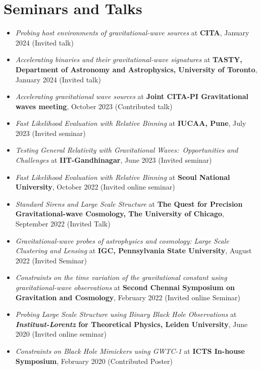 		\section{Seminars and Talks}
		\begin{itemize}[leftmargin=*]
			\item \textit{Probing host environments of gravitational-wave sources} at \textbf{CITA}, January 2024 (Invited talk)
			\item \textit{Accelerating binaries and their gravitational-wave signatures} at \textbf{TASTY, Department of Astronomy and Astrophysics, University of Toronto}, January 2024 (Invited talk)
			\item \textit{Accelerating gravitational wave sources} at \textbf{Joint CITA-PI Gravitational waves meeting}, October 2023 (Contributed talk)
			\item \textit{Fast Likelihood Evaluation with Relative Binning} at\textbf{ IUCAA, Pune}, July 2023 (Invited seminar)
			\item \textit{Testing General Relativity with Gravitational Waves:\ Opportunities and Challenges} at \textbf{IIT-Gandhinagar}, June 2023 (Invited seminar)
			\item \textit{Fast Likelihood Evaluation with Relative Binning} at \textbf{Seoul National University}, October 2022 (Invited online seminar)
			\item \textit{Standard Sirens and Large Scale Structure} at \textbf{The Quest for Precision Gravitational-wave Cosmology, The University of Chicago}, September 2022 (Invited Talk)    \item \textit{Gravitational-wave probes of astrophysics and cosmology: Large Scale Clustering and Lensing} at \textbf{IGC, Pennsylvania State University}, August 2022 (Invited Seminar)
			\item \textit{Constraints on the time variation of the gravitational constant using gravitational-wave observations} at \textbf{Second Chennai Symposium on Gravitation and Cosmology}, February 2022 (Invited online Seminar)
			\item \textit{Probing Large Scale Structure using Binary Black Hole Observations} at \textbf{\textit{Instituut-Lorentz} for Theoretical Physics, Leiden University}, June 2020 (Invited online seminar)
			\item \textit{Constraints on Black Hole Mimickers using GWTC-1} at \textbf{ICTS In-house Symposium}, February 2020 (Contributed Poster)

\end{itemize}
